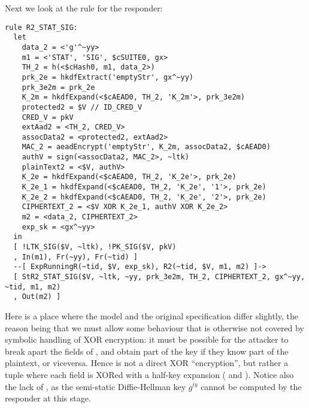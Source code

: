 Next we look at the rule for the responder:
\begin{lstlisting}
rule R2_STAT_SIG:
  let
    data_2 = <'g'^~yy>
    m1 = <'STAT', 'SIG', $cSUITE0, gx> 
    TH_2 = h(<$cHash0, m1, data_2>)
    prk_2e = hkdfExtract('emptyStr', gx^~yy)
    prk_3e2m = prk_2e
    K_2m = hkdfExpand(<$cAEAD0, TH_2, 'K_2m'>, prk_3e2m)
    protected2 = $V // ID_CRED_V
    CRED_V = pkV
    extAad2 = <TH_2, CRED_V> 
    assocData2 = <protected2, extAad2>
    MAC_2 = aeadEncrypt('emptyStr', K_2m, assocData2, $cAEAD0)
    authV = sign(<assocData2, MAC_2>, ~ltk)
    plainText2 = <$V, authV>
    K_2e = hkdfExpand(<$cAEAD0, TH_2, 'K_2e'>, prk_2e)
    K_2e_1 = hkdfExpand(<$cAEAD0, TH_2, 'K_2e', '1'>, prk_2e)
    K_2e_2 = hkdfExpand(<$cAEAD0, TH_2, 'K_2e', '2'>, prk_2e)
    CIPHERTEXT_2 = <$V XOR K_2e_1, authV XOR K_2e_2> 
    m2 = <data_2, CIPHERTEXT_2>
    exp_sk = <gx^~yy>
  in
  [ !LTK_SIG($V, ~ltk), !PK_SIG($V, pkV)
  , In(m1), Fr(~yy), Fr(~tid) ]
  --[ ExpRunningR(~tid, $V, exp_sk), R2(~tid, $V, m1, m2) ]->
  [ StR2_STAT_SIG($V, ~ltk, ~yy, prk_3e2m, TH_2, CIPHERTEXT_2, gx^~yy, ~tid, m1, m2) 
  , Out(m2) ]
\end{lstlisting}
Here is a place where the model and the original specification differ
slightly, the reason being that we must allow some behaviour that is
otherwise not covered by symbolic handling of XOR encryption: it must
be possible for the attacker to break apart the fields of
, and obtain part of the key 
if they know part of the plaintext, or viceversa.
%
Hence  is not a direct XOR ``encryption'', but rather a tuple
where each field is XORed with a half-key expansion ( and
).  Notice also the lack of , as the semi-static
Diffie-Hellman key $g^{iy}$ cannot be computed by the responder at this stage.


